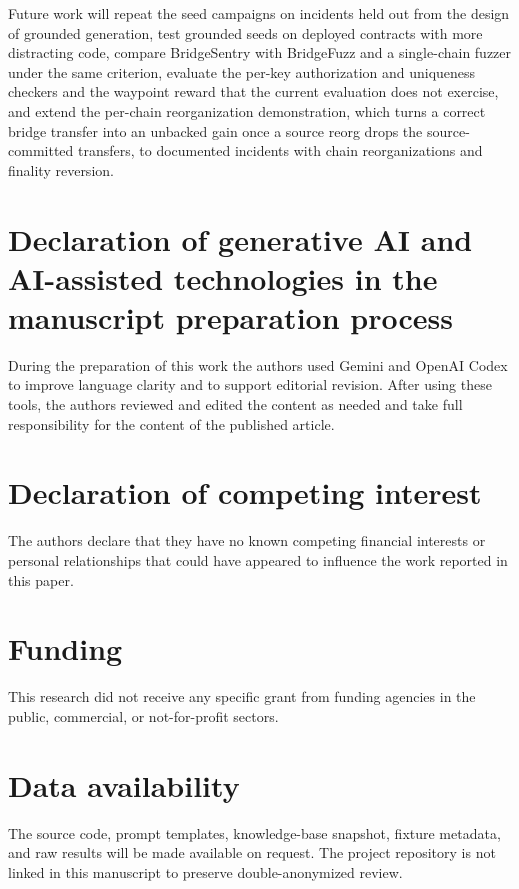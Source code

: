 \documentclass[a4paper]{cas-sc}
\begin{document}
Future work will repeat the seed campaigns on incidents held out from the design of grounded generation, test grounded seeds on deployed contracts with more distracting code, compare BridgeSentry with BridgeFuzz and a single-chain fuzzer under the same criterion, evaluate the per-key authorization and uniqueness checkers and the waypoint reward that the current evaluation does not exercise, and extend the per-chain reorganization demonstration, which turns a correct bridge transfer into an unbacked gain once a source reorg drops the source-committed transfers, to documented incidents with chain reorganizations and finality reversion.

\section*{Declaration of generative AI and AI-assisted technologies in the manuscript preparation process}
During the preparation of this work the authors used Gemini and OpenAI Codex to improve language clarity and to support editorial revision. After using these tools, the authors reviewed and edited the content as needed and take full responsibility for the content of the published article.

\section*{Declaration of competing interest}
The authors declare that they have no known competing financial interests or personal relationships that could have appeared to influence the work reported in this paper.

\section*{Funding}
This research did not receive any specific grant from funding agencies in the public, commercial, or not-for-profit sectors.

\section*{Data availability}
The source code, prompt templates, knowledge-base snapshot, fixture metadata, and raw results will be made available on request. The project repository is not linked in this manuscript to preserve double-anonymized review.



\end{document}
